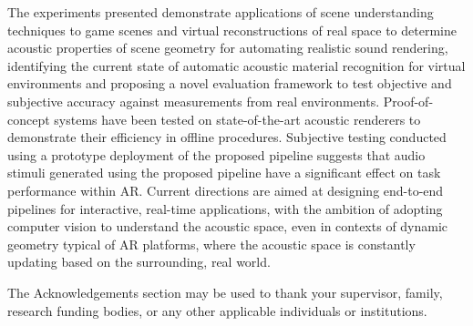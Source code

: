 The experiments presented demonstrate applications of scene understanding techniques to game scenes and virtual reconstructions of real space to determine acoustic properties of scene geometry for automating realistic sound rendering, identifying the current state of automatic acoustic material recognition for virtual environments and proposing a novel evaluation framework to test objective and subjective accuracy against measurements from real environments. Proof-of-concept systems have been tested on state-of-the-art acoustic renderers to demonstrate their efficiency in offline procedures. Subjective testing conducted using a prototype deployment of the proposed pipeline suggests that audio stimuli generated using the proposed pipeline have a significant effect on task performance within AR.
Current directions are aimed at designing end-to-end pipelines for interactive, real-time applications, with the ambition of adopting computer vision to understand the acoustic space, even in contexts of dynamic geometry typical of AR platforms, where the acoustic space is constantly updating based on the surrounding, real world.

The Acknowledgements section may be used to thank your supervisor, family, research funding bodies, or any other applicable individuals or institutions.

\afterpreface{} 
